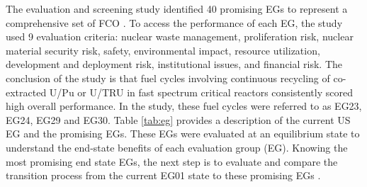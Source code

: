The evaluation and screening study identified 40 promising 
\glspl{EG} to represent a comprehensive set of 
\gls{FCO} \cite{wigeland_nuclear_2014}. 
To access the performance of each \gls{EG}, the study
used 9 evaluation criteria: nuclear waste management, 
proliferation risk, nuclear material security risk, 
safety, environmental impact, resource utilization, 
development and deployment risk, institutional issues, and 
financial risk.  
The conclusion of the study is that fuel cycles
involving continuous recycling of co-extracted U/Pu or U/TRU in 
fast spectrum critical reactors consistently scored high overall 
performance.
In the study, these fuel cycles were referred to as EG23, EG24, 
EG29 and EG30. 
Table \ref{tab:eg} provides a description of the current 
\gls{US} \gls{EG} and the promising \glspl{EG}. 
These \glspl{EG} were evaluated at an equilibrium state to 
understand the end-state benefits of each evaluation group (EG).
Knowing the most promising end state \glspl{EG}, 
the next step is to evaluate and compare the transition process 
from the current EG01 
state to these promising \glspl{EG} \cite{feng_standardized_2016}. 
